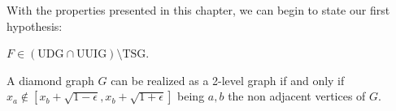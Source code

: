 With the properties presented in this chapter, we can begin to state our first hypothesis:

\begin{hyp}
  $F \in (\text{UDG}\cap\text{UUIG}) \setminus \text{TSG}$.
\end{hyp}


\begin{claim}
 A diamond graph $G$ can be realized as a 2-level graph if and only if $x_a \notin [ x_b + \sqrt{1-\epsilon},x_b + \sqrt{1+\epsilon}]$ being $a,b$ the non adjacent vertices of $G$.
\end{claim}
